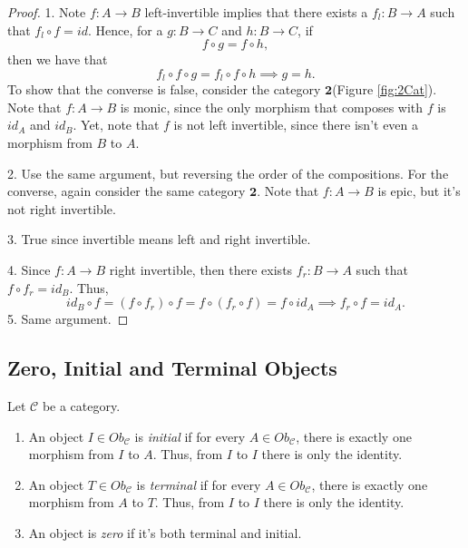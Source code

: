 \begin{proof}
	1. Note $f:A \to B$ left-invertible implies that there exists a $f_l:B \to A$ such that
	$f_l \circ f = id$. Hence, for a $g:B\to C$ and $h: B \to C$, if
	\begin{displaymath}
		f \circ g = f \circ h,
	\end{displaymath}
	then we have that
	\begin{displaymath}
		f_l \circ f \circ g = f_l \circ f \circ h \implies g =h.
	\end{displaymath}
	To show that the converse is false, consider the category $\mathbf{2}$(Figure \ref{fig:2Cat}). Note that
	$f:A\to B$ is monic, since the only morphism that composes with $f$ is
	$id_A$ and $id_B$. Yet, note that $f$ is not left invertible, since there isn't even
	a morphism from $B$ to $A$.

	2. Use the same argument, but reversing the order of the compositions.
	For the converse, again consider the same category $\mathbf{2}$. Note that
	$f:A\to B$ is epic, but it's not right invertible.

	3. True since invertible means left and right invertible.

	4. Since $f:A \to B$ right invertible, then there exists $f_r:B \to A$
	such that $f \circ f_r = id_B$. Thus,
	\begin{displaymath}
		id_B \circ f = (f \circ f_r) \circ f =
		f \circ (f_r \circ f) =
		f \circ id_A \implies f_r \circ f = id_A.
	\end{displaymath}
	5. Same argument.
\end{proof}

\subsection{Zero, Initial and Terminal Objects}

\begin{definition}
	Let $\mathcal C$ be a category.
	\begin{enumerate}[1.]
		\item An object $I \in Ob_\mathcal C$ is \textit{initial} if for every $A \in Ob_\mathcal C$,
		      there is exactly one morphism from $I$ to $A$. Thus, from $I$ to $I$ there is only the identity.
		\item An object $T \in Ob_\mathcal C$ is \textit{terminal} if for every $A \in Ob_\mathcal C$,
		      there is exactly one morphism from $A$ to $T$. Thus, from $I$ to $I$ there is only the identity.
		\item An object is \textit{zero} if it's both terminal and initial.
	\end{enumerate}
\end{definition}

